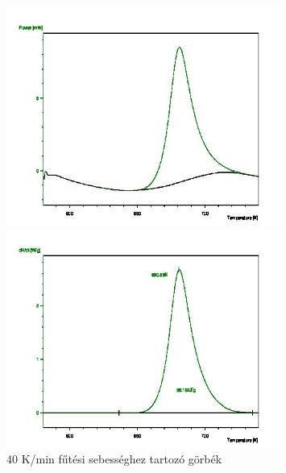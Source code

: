 \documentclass[a4paper,12pt]{article}
\begin{document}
\begin{figure}[H]
\centering
\begin{minipage}{0.49\textwidth}
\centering
\includegraphics[width=0.8\textwidth]{6outs.jpg}
\end{minipage}
\begin{minipage}{0.49\textwidth}
\centering
\includegraphics[width=0.8\textwidth]{7outs.jpg}
\end{minipage}
\caption{40 K/min fűtési sebességhez tartozó görbék}
\end{figure}
\end{document}
